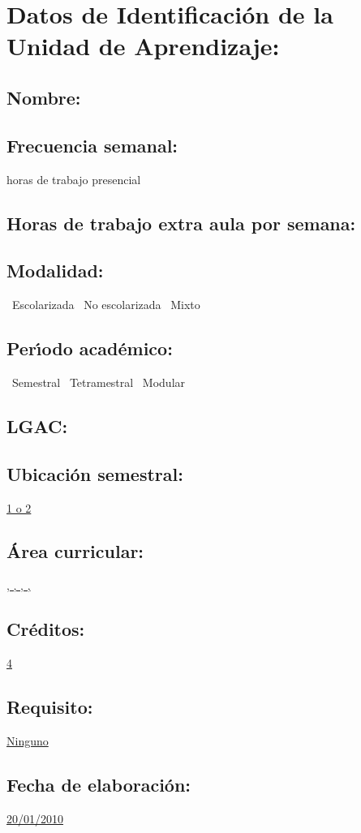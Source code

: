 \documentclass[10 pt]{article}
\begin{document}


\section{Datos de Identificaci\'{o}n de la Unidad de Aprendizaje:}
\subsection{Nombre:} 
\subsection{Frecuencia semanal:} horas de trabajo presencial 
\subsection{Horas de trabajo extra aula por semana:} 
\subsection{Modalidad:} \yes~Escolarizada \no~No escolarizada \no~Mixto
\subsection{Per\'{\i}odo acad\'{e}mico:} \yes~Semestral
\no~Tetramestral \no~Modular
\subsection{LGAC:} \underline{\seys}
\subsection{Ubicaci\'{o}n semestral:} \underline{1 o 2}
\subsection{\'{A}rea curricular:} \underline{\fb, \fa, \da, \le, \inv}
\subsection{Cr\'{e}ditos:} \underline{4}
\subsection{Requisito:} \underline{Ninguno}
\subsection{Fecha de elaboraci\'{o}n:} \underline{20/01/2010}
\end{document}
